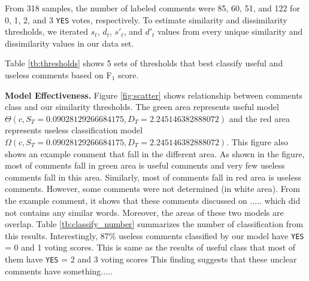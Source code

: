 
%

From 318 samples, the number of labeled comments were 85, 60, 51, and 122 for 0, 1, 2, and 3 \texttt{YES} votes, respectively.
To estimate similarity and dissimilarity thresholds, we iterated $s_t$, $d_t$, $s'_t$, and $d'_t$ values from every unique similarity and dissimilarity values in our data set.
  
Table \ref{tb:thresholds} shows 5 sets of thresholds that best classify useful and useless comments based on F$_1$ score.

\textbf{Model Effectiveness.} Figure \ref{fig:scatter} shows relationship between comments class and our similarity thresholds. The green area represents useful model $\Theta(c,S_T=0.09028129266684175,D_T= 2.245146382888072)$ and the red area represents useless classification model $\Omega(c,S_T=0.09028129266684175,D_T= 2.245146382888072)$. This figure also shows an example comment that fall in the different area. As shown in the figure, most of comments fall in green area is useful comments and very few useless comments fall in this area. Similarly, most of comments fall in red area is useless comments. However, some comments were not determined (in white area). From the example comment, it shows that these comments discussed on ..... which did not contains any similar words. Moreover, the areas of these two models are overlap. Table \ref{tb:classify_number} summarizes the number of classification from this results. Interestingly, 87\% useless comments classified by our model have \texttt{YES} = 0 and 1 voting scores. This is same as the results of useful class that most of them have \texttt{YES} = 2 and 3 voting scores
This finding suggests that these unclear comments have something.....

